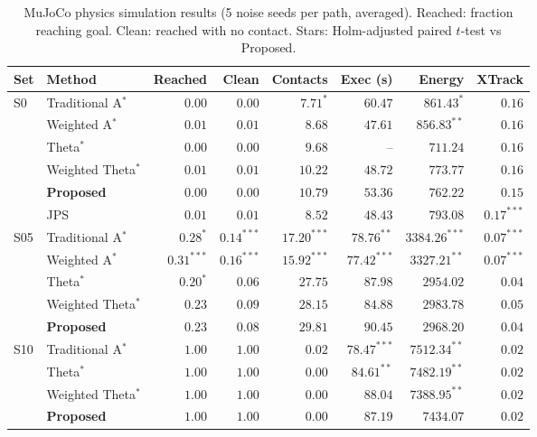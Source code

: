 \begin{table}[htbp]
\centering\small
\caption{MuJoCo physics simulation results (5 noise seeds per path, averaged). Reached: fraction reaching goal. Clean: reached with no contact. Stars: Holm-adjusted paired $t$-test vs Proposed.}\label{tab:mjsim}
\begin{tabular}{llrrrrrr}
\toprule
Set & Method & Reached & Clean & Contacts & Exec (s) & Energy & XTrack \\
\midrule
S0 & Traditional A$^{*}$ & $0.00$ & $0.00$ & $7.71^{*}$ & $60.47$ & $861.43^{*}$ & $0.16$ \\
 & Weighted A$^{*}$ & $0.01$ & $0.01$ & $8.68$ & $47.61$ & $856.83^{**}$ & $0.16$ \\
 & Theta$^{*}$ & $0.00$ & $0.00$ & $9.68$ & -- & $711.24$ & $0.16$ \\
 & Weighted Theta$^{*}$ & $0.01$ & $0.01$ & $10.22$ & $48.72$ & $773.77$ & $0.16$ \\
 & \textbf{Proposed} & $0.00$ & $0.00$ & $10.79$ & $53.36$ & $762.22$ & $0.15$ \\
 & JPS & $0.01$ & $0.01$ & $8.52$ & $48.43$ & $793.08$ & $0.17^{***}$ \\
\midrule
S05 & Traditional A$^{*}$ & $0.28^{*}$ & $0.14^{***}$ & $17.20^{***}$ & $78.76^{**}$ & $3384.26^{***}$ & $0.07^{***}$ \\
 & Weighted A$^{*}$ & $0.31^{***}$ & $0.16^{***}$ & $15.92^{***}$ & $77.42^{***}$ & $3327.21^{**}$ & $0.07^{***}$ \\
 & Theta$^{*}$ & $0.20^{*}$ & $0.06$ & $27.75$ & $87.98$ & $2954.02$ & $0.04$ \\
 & Weighted Theta$^{*}$ & $0.23$ & $0.09$ & $28.15$ & $84.88$ & $2983.78$ & $0.05$ \\
 & \textbf{Proposed} & $0.23$ & $0.08$ & $29.81$ & $90.45$ & $2968.20$ & $0.04$ \\
\midrule
S10 & Traditional A$^{*}$ & $1.00$ & $1.00$ & $0.02$ & $78.47^{***}$ & $7512.34^{**}$ & $0.02$ \\
 & Theta$^{*}$ & $1.00$ & $1.00$ & $0.00$ & $84.61^{**}$ & $7482.19^{**}$ & $0.02$ \\
 & Weighted Theta$^{*}$ & $1.00$ & $1.00$ & $0.00$ & $88.04$ & $7388.95^{**}$ & $0.02$ \\
 & \textbf{Proposed} & $1.00$ & $1.00$ & $0.00$ & $87.19$ & $7434.07$ & $0.02$ \\
\bottomrule
\end{tabular}
\end{table}
